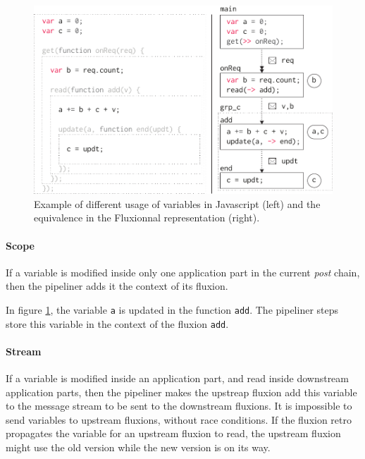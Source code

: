 \begin{figure}[h!]
\begin{center}
  \includegraphics[width=\linewidth]{ressources/states.pdf}
  \caption{Example of different usage of variables in Javascript (left) and the equivalence in the Fluxionnal representation (right).}
  \label{fig:states}
\end{center}
\end{figure}

\paragraph{Scope}
If a variable is modified inside only one application part in the current \textit{post} chain, then the pipeliner adds it the context of its fluxion.

In figure \ref{fig:states}, the variable \texttt{a} is updated in the function \texttt{add}.
The pipeliner steps store this variable in the context of the fluxion \texttt{add}.

\paragraph{Stream}
If a variable is modified inside an application part, and read inside downstream application parts, then the pipeliner makes the upstreap fluxion add this variable to the message stream to be sent to the downstream fluxions.
It is impossible to send variables to upstream flux\-ions, without race conditions.
If the fluxion retro propagates the variable for an upstream fluxion to read, the upstream fluxion might use the old version while the new version is on its way.

